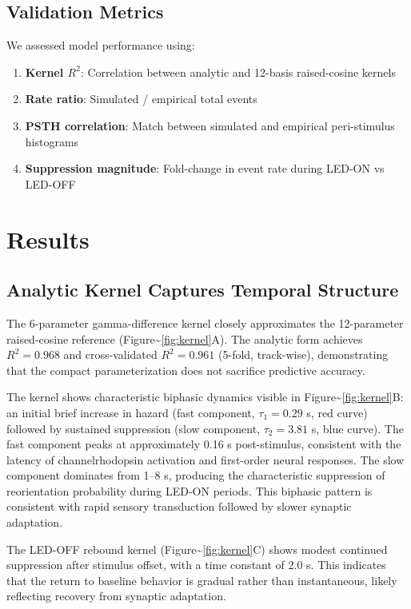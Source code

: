 \documentclass[
  11pt,
  letterpaper,
]{article}
\begin{document}
\subsection{Validation Metrics}

We assessed model performance using:

\begin{enumerate}
    \item \textbf{Kernel $R^2$}: Correlation between analytic and 12-basis raised-cosine kernels
    \item \textbf{Rate ratio}: Simulated / empirical total events
    \item \textbf{PSTH correlation}: Match between simulated and empirical peri-stimulus histograms
    \item \textbf{Suppression magnitude}: Fold-change in event rate during LED-ON vs LED-OFF
\end{enumerate}

\section{Results}

\subsection{Analytic Kernel Captures Temporal Structure}

The 6-parameter gamma-difference kernel closely approximates the
12-parameter raised-cosine reference
(Figure\textasciitilde{}\ref{fig:kernel}A). The analytic form achieves
\(R^2 = 0.968\) and cross-validated \(R^2 = 0.961\) (5-fold,
track-wise), demonstrating that the compact parameterization does not
sacrifice predictive accuracy.

The kernel shows characteristic biphasic dynamics visible in
Figure\textasciitilde{}\ref{fig:kernel}B: an initial brief increase in
hazard (fast component, \(\tau_1 = 0.29\) s, red curve) followed by
sustained suppression (slow component, \(\tau_2 = 3.81\) s, blue curve).
The fast component peaks at approximately 0.16 s post-stimulus,
consistent with the latency of channelrhodopsin activation and
first-order neural responses. The slow component dominates from 1--8 s,
producing the characteristic suppression of reorientation probability
during LED-ON periods. This biphasic pattern is consistent with rapid
sensory transduction followed by slower synaptic adaptation.

The LED-OFF rebound kernel (Figure\textasciitilde{}\ref{fig:kernel}C)
shows modest continued suppression after stimulus offset, with a time
constant of 2.0 s. This indicates that the return to baseline behavior
is gradual rather than instantaneous, likely reflecting recovery from
synaptic adaptation.
\end{document}
